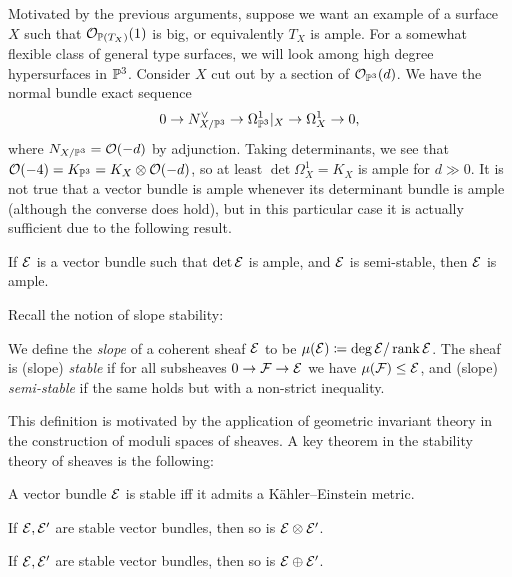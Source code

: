 Motivated by the previous arguments, suppose we want an example of a surface $X$
such that $\O_{\P(T_X)}(1)$ is big, or equivalently $T_X$ is ample. For a
somewhat flexible class of general type surfaces, we will look among high degree
hypersurfaces in $\P^3$. Consider $X$ cut out by a section of $\O_{\P^3}(d)$. We
have the normal bundle exact sequence
\begin{equation*}
    0 \to N_{X/\P^3}^\vee \to \Omega^1_{\P^3}|_X \to \Omega^1_X \to 0,
\end{equation*}
where $N_{X/\P^3}=\O(-d)$ by adjunction. Taking determinants, we see that
$\O(-4)=K_{\P^3}=K_X\otimes\O(-d)$, so at least $\det\Omega^1_X=K_X$ is ample
for $d\gg0$. It is not true that a vector bundle is ample whenever its
determinant bundle is ample (although the converse does hold), %
but in this
particular case it is actually sufficient due to the following result.

\begin{proposition}
    If $\calE$ is a vector bundle such that $\det\calE$ is ample, and $\calE$ is
    semi-stable, then $\calE$ is ample.
\end{proposition}



Recall the notion of slope stability:

\begin{definition}
    We define the \emph{slope} of a coherent sheaf $\calE$ to be
    $\mu(\calE)\coloneqq\deg\calE/\rank\calE$. The sheaf is (slope)
    \emph{stable} if for all subsheaves $0\to\calF\to\calE$ we have
    $\mu(\calF)\le\calE$, and (slope) \emph{semi-stable} if the same holds but
    with a non-strict inequality. %
\end{definition}

This definition is motivated by the application of geometric invariant theory in
the construction of moduli spaces of sheaves. A key theorem in the stability
theory of sheaves is the following:

\begin{theorem}[Yau]
    A vector bundle $\calE$ is stable iff it admits a K\"ahler--Einstein metric.
\end{theorem}

\begin{proposition}
    If $\calE,\calE'$ are stable vector bundles, then so is $\calE\otimes\calE'$.
\end{proposition}

\begin{proposition}
    If $\calE,\calE'$ are stable vector bundles, then so is $\calE\oplus\calE'$.
\end{proposition}

